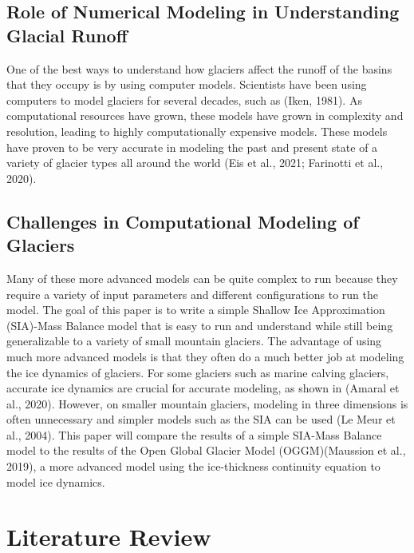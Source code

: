 \documentclass{article}
\begin{document}
\subsection{Role of Numerical Modeling in Understanding Glacial Runoff}
One of the best ways to understand how glaciers affect the runoff of the basins that they occupy is by using computer models. 
Scientists have been using computers to model glaciers for several decades, 
such as (Iken, 1981). As computational resources have grown, these models have grown in complexity and resolution, leading 
to highly computationally expensive models. These models have proven to be very accurate in modeling the past and present state of a variety 
of glacier types all around the world (Eis et al., 2021; Farinotti et al., 2020).

\subsection{Challenges in Computational Modeling of Glaciers}
Many of these more advanced models can be quite complex to run because they require a variety of input parameters and different configurations to run the model. The 
goal of this paper is to write a simple Shallow Ice Approximation (SIA)-Mass Balance model that is easy to run and understand while still 
being generalizable to a variety of small mountain glaciers. The advantage of using much more advanced models is that they often do 
a much better job at modeling the ice dynamics of glaciers. For some glaciers such as marine calving glaciers, accurate ice dynamics are 
crucial for accurate modeling, as shown in (Amaral et al., 2020). However, on smaller mountain glaciers, modeling in three dimensions is often 
unnecessary and simpler models such as the SIA can be used (Le Meur et al., 2004). This paper will compare the results of a simple SIA-Mass Balance model to the 
results of the Open Global Glacier Model (OGGM)(Maussion et al., 2019), a more advanced model using the ice-thickness continuity equation to model ice dynamics.

\section{Literature Review}
\end{document}
